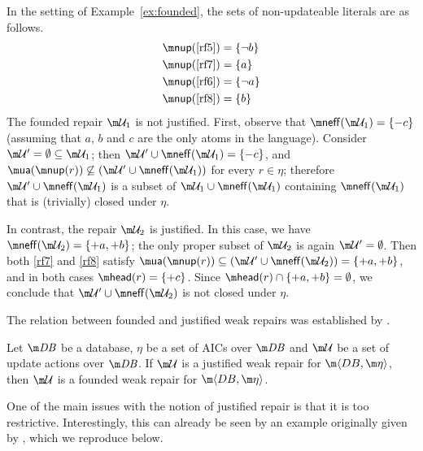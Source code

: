 \begin{example}
  In the setting of Example~\ref{ex:founded}, the sets of non-updateable literals are as follows.
  \begin{align*}
    \nup(\ref{rf5}) &= \{\neg b\} \\
    \nup(\ref{rf7}) &= \{a\} \\
    \nup(\ref{rf6}) &= \{\neg a\} \\
    \nup(\ref{rf8}) &= \{b\}
  \end{align*}
  The founded repair $\UU_1$ is not justified.
  First, observe that $\neff(\UU_1)=\{{-c}\}$ (assuming that $a$, $b$ and $c$ are the only atoms in the language).
  Consider $\UU'=\emptyset\subseteq\UU_1$; then $\UU'\cup\neff(\UU_1)=\{{-c}\}$, and $\actof(\nup(r))\not\subseteq(\UU'\cup\neff(\UU_1))$ for every $r\in\eta$; therefore $\UU'\cup\neff(\UU_1)$ is a subset of $\UU_1\cup\neff(\UU_1)$ containing $\neff(\UU_1)$ that is (trivially) closed under $\eta$.

  In contrast, the repair $\UU_2$ is justified.
  In this case, we have $\neff(\UU_2)=\{{+a},{+b}\}$; the only proper subset of $\UU_2$ is again $\UU'=\emptyset$.
  Then both \ref{rf7} and \ref{rf8} satisfy $\actof(\nup(r))\subseteq(\UU'\cup\neff(\UU_2))=\{{+a},{+b}\}$, and in both cases $\head(r)=\{{+c}\}$.
  Since $\head(r)\cap\{{+a},{+b}\}=\emptyset$, we conclude that $\UU'\cup\neff(\UU_2)$ is not closed under $\eta$.
\end{example}

The relation between founded and justified weak repairs was established by \citet{tplp/CaropreseT11}.
\begin{lemma}
  \label{lem:justified-founded}
  Let $\db$ be a database, $\eta$ be a set of AICs over $\db$ and $\UU$ be a set of update actions over $\db$.
  If $\UU$ is a justified weak repair for $\fulldb$, then $\UU$ is a founded weak repair for $\fulldb$.
\end{lemma}

One of the main issues with the notion of justified repair is that it is too restrictive.
Interestingly, this can already be seen by an example originally given by \citet{tplp/CaropreseT11}, which we reproduce below.

